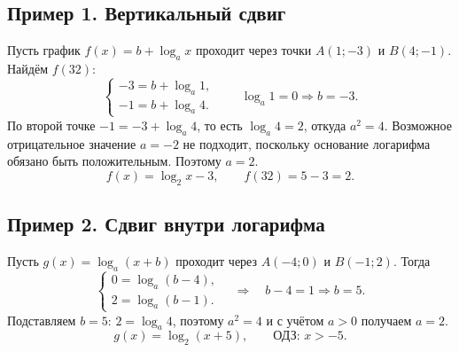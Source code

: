\documentclass[a4paper,12pt]{article}
\begin{document}
\subsection*{Пример 1. Вертикальный сдвиг}
Пусть график $f(x)=b+\log_a x$ проходит через точки $A(1;-3)$ и $B(4;-1)$. Найдём $f(32)$:
\[
\begin{cases}-3=b+\log_a1,\\-1=b+\log_a4.\end{cases}\qquad
\log_a1=0\Rightarrow b=-3.
\]
По второй точке $-1=-3+\log_a4$, то есть $\log_a4=2$, откуда $a^2=4$. Возможное отрицательное значение $a=-2$ не подходит, поскольку основание логарифма обязано быть положительным. Поэтому $a=2$.
\[
\boxed{f(x)=\log_2x-3},\qquad
\boxed{f(32)=5-3=2}.
\]
\begin{center}
\end{center}
\subsection*{Пример 2. Сдвиг внутри логарифма}
Пусть $g(x)=\log_a(x+b)$ проходит через $A(-4;0)$ и $B(-1;2)$. Тогда
\[
\begin{cases}0=\log_a(b-4),\\2=\log_a(b-1).\end{cases}
\quad\Rightarrow\quad b-4=1\Rightarrow b=5.
\]
Подставляем $b=5$: $2=\log_a4$, поэтому $a^2=4$ и с учётом $a>0$ получаем $a=2$.
\[
\boxed{g(x)=\log_2(x+5)},\qquad \text{ОДЗ: }x>-5.
\]
\clearpage
\end{document}
